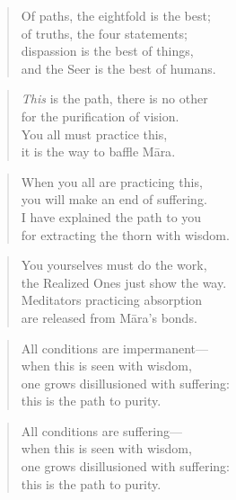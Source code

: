 \documentclass[12pt,openany]{book}%
\begin{document}
\begin{verse}%
Of paths, the eightfold is the best; \\
of truths, the four statements; \\
dispassion is the best of things, \\
and the Seer is the best of humans. 

%
\end{verse}

\begin{verse}%
\emph{This} is the path, there is no other \\
for the purification of vision. \\
You all must practice this, \\
it is the way to baffle \textsanskrit{Māra}. 

%
\end{verse}

\begin{verse}%
When you all are practicing this, \\
you will make an end of suffering. \\
I have explained the path to you \\
for extracting the thorn with wisdom. 

%
\end{verse}

\begin{verse}%
You yourselves must do the work, \\
the Realized Ones just show the way. \\
Meditators practicing absorption \\
are released from \textsanskrit{Māra}’s bonds. 

%
\end{verse}

\begin{verse}%
All conditions are impermanent—\\
when this is seen with wisdom, \\
one grows disillusioned with suffering: \\
this is the path to purity. 

%
\end{verse}

\begin{verse}%
All conditions are suffering—\\
when this is seen with wisdom, \\
one grows disillusioned with suffering: \\
this is the path to purity. 

%
\end{verse}
\end{document}
